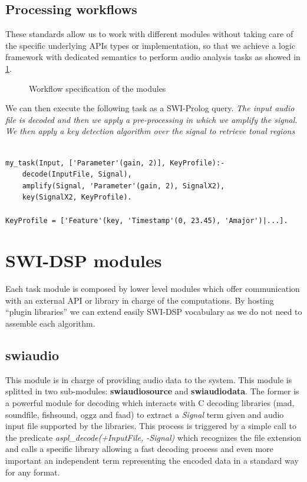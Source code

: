 \documentclass[runningheads]{llncs}
\begin{document}
\subsection{Processing workflows}\label{subsec:worflow}

These standards allow us to work with different modules without taking care of the specific underlying APIs types or implementation, so that we achieve a logic framework with dedicated semantics to perform audio analysis tasks as showed in \ref{fig:workflow}.

\begin{figure}
\centerline{}
\caption{Workflow specification of the modules}
\label{fig:workflow}
\end{figure}

We can then execute the following task as a SWI-Prolog query. \textit{The input audio file is decoded and then we apply a pre-processing in which we amplify the signal. We then apply a key detection algorithm over the signal to retrieve tonal regions}

\begin{verbatim}
 
my_task(Input, ['Parameter'(gain, 2)], KeyProfile):-
	decode(InputFile, Signal),
	amplify(Signal, 'Parameter'(gain, 2), SignalX2),
	key(SignalX2, KeyProfile).

KeyProfile = ['Feature'(key, 'Timestamp'(0, 23.45), 'Amajor')|...].	

\end{verbatim}

\section{SWI-DSP modules}\label{sec:modules}

Each task module is composed by lower level modules which offer communication with an external API or library in charge of the computations. By hosting ``plugin libraries'' we can extend easily SWI-DSP vocabulary as we do not need to assemble each algorithm.

\subsection{swiaudio}\label{subsec:swiaudio}

This module is in charge of providing audio data to the system. This module is splitted in two sub-modules: \textbf{swiaudiosource} and \textbf{swiaudiodata}. The former is a powerful module for decoding which interacts with C decoding libraries (mad, soundfile, fishsound, oggz and faad) to extract a \textit{Signal} term given and audio input file supported by the libraries. This process is triggered by a simple call to the predicate \textit{aspl\_decode(+InputFile, -Signal)} which recognizes the file extension and calls a specific library allowing a fast decoding process and even more important an independent term representing the encoded data in a standard way for any format.
\end{document}
